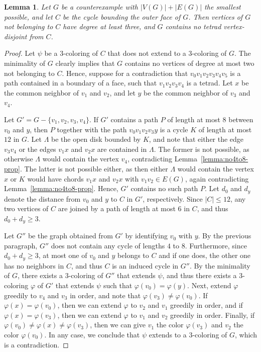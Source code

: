 \documentclass[12pt,twoside,openright,a4paper]{book}
\newtheorem{lemma}[theorem]{Lemma}
\begin{document}
\begin{lemma}\label{lemma:no4to8-redu}
Let $G$ be a counterexample with $|V(G)|+|E(G)|$ the smallest possible, and let $C$ be the cycle bounding the outer face of $G$.
Then vertices of $G$ not belonging to $C$ have degree at least three, and $G$ contains no 
tetrad vertex-disjoint from $C$.
\end{lemma}
\begin{proof}
Let $\psi$ be a $3$-coloring of $C$ that does not extend to a $3$-coloring of $G$.
The minimality of $G$ clearly implies that $G$ contains no vertices of degree at most two not belonging to $C$.
Hence, suppose for a contradiction that $v_0v_1v_2v_3v_4v_5$ is a path contained in a boundary of a face, such that $v_1v_2v_3v_4$ is a tetrad.
Let $x$ be the common neighbor of $v_1$ and $v_2$, and let $y$ be the common neighbor of $v_3$ and $v_4$.

Let $G'=G-\{v_1,v_2,v_3,v_4\}$.  If $G'$ contains a path $P$ of length at most $8$ between $v_0$ and $y$, then
$P$ together with the path $v_0v_1v_2v_3y$ is a cycle $K$ of length at most $12$ in $G$.  Let $\Lambda$ be the open disk bounded by
$K$, and note that either the edge $v_3v_4$ or the edges $v_1x$ and $v_2x$ are contained in $\Lambda$.  The former
is not possible, as otherwise $\Lambda$ would contain the vertex $v_4$, contradicting Lemma~\ref{lemma:no4to8-prop}.
The latter is not possible either, as then either $\Lambda$ would contain the vertex $x$ or $K$ would have chords
$v_1x$ and $v_2x$ with $v_1v_2\in E(G)$, again contradicting Lemma~\ref{lemma:no4to8-prop}.
Hence, $G'$ contains no such path $P$.  Let $d_0$ and $d_y$ denote the distance from $v_0$ and $y$ to $C$ in $G'$, respectively.
Since $|C|\le 12$, any two vertices of $C$ are joined by a path of length at most $6$ in $C$, and thus $d_0+d_y\ge 3$.

Let $G''$ be the graph obtained from $G'$ by identifying $v_0$ with $y$.  By the previous paragraph,
$G''$ does not contain any cycle of lengths $4$ to $8$.  Furthermore, since $d_0+d_y\ge 3$, at most one of $v_0$ and $y$ belongs
to $C$ and if one does, the other one has no neighbors in $C$, and thus $C$ is an induced cycle in $G''$.  By the minimality of $G$, there exists a $3$-coloring of $G''$ that extends $\psi$,
and thus there exists a $3$-coloring $\varphi$ of $G'$ that extends $\psi$ such that $\varphi(v_0)=\varphi(y)$.
Next, extend $\varphi$ greedily to $v_4$ and $v_3$ in order, and note that $\varphi(v_3)\neq \varphi(v_0)$.
If $\varphi(x)=\varphi(v_0)$, then we can extend $\varphi$ to $v_2$ and $v_1$ greedily in order,
and if $\varphi(x)=\varphi(v_3)$, then we can extend $\varphi$ to $v_1$ and $v_2$ greedily in order.
Finally, if $\varphi(v_0)\neq \varphi(x)\neq\varphi(v_3)$, then we can give $v_1$ the color $\varphi(v_3)$
and $v_2$ the color $\varphi(v_0)$.  In any case, we conclude that $\psi$ extends to a $3$-coloring of $G$, which is a contradiction.
\end{proof}
\end{document}
